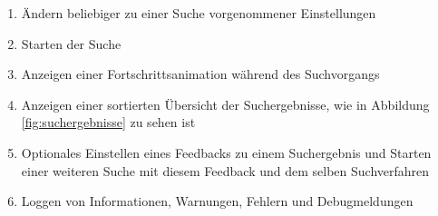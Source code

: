 \begin{enumerate} [label=\bfseries /F \arabic*0/, leftmargin=*]
	\item Ändern beliebiger zu einer Suche vorgenommener Einstellungen \label{f:einstellungen_nach_ueberpruefung_aendern}
	\newline
	\item Starten der Suche \label{f:suche_starten}
	\item Anzeigen einer Fortschrittsanimation während des Suchvorgangs \label{f:fortschrittsanimation}
	\newline
	\item Anzeigen einer sortierten \"Ubersicht der Suchergebnisse, wie in Abbildung \ref{fig:suchergebnisse} zu sehen ist \label{f:suchergebnisse_anzeigen}
	\item Optionales Einstellen eines Feedbacks zu einem Suchergebnis und Starten einer weiteren Suche mit diesem Feedback und dem selben Suchverfahren \label{f:feedback}
	
	\item Loggen von Informationen, Warnungen, Fehlern und Debugmeldungen \label{f:loggen}
	 
\end{enumerate}

